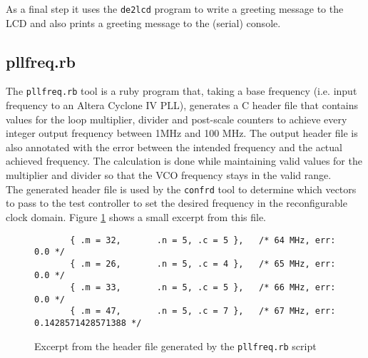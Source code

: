 As a final step it uses the \texttt{de2lcd} program to write a greeting message to the LCD
and also prints a greeting message to the (serial) console.


\subsection{pllfreq.rb}
The \texttt{pllfreq.rb} tool is a ruby program that, taking a base frequency (i.e. input
frequency to an Altera Cyclone IV PLL), generates a C header file that contains values
for the loop multiplier, divider and post-scale counters to achieve every integer
output frequency between 1MHz and 100 MHz. The output header file is also annotated with the
error between the intended frequency and the actual achieved frequency. The calculation
is done while maintaining valid values for the multiplier and divider so that the VCO
frequency stays in the valid range.
\\

The generated header file is used by the \texttt{confrd} tool to determine which vectors
to pass to the test controller to set the desired frequency in the reconfigurable
clock domain. Figure \ref{listing:pllfreq_h} shows a small excerpt from this file.

\begin{figure}[h!]
\lstset{basicstyle=\scriptsize\ttfamily}
\begin{lstlisting}
       { .m = 32,       .n = 5, .c = 5 },   /* 64 MHz, err: 0.0 */
       { .m = 26,       .n = 5, .c = 4 },   /* 65 MHz, err: 0.0 */
       { .m = 33,       .n = 5, .c = 5 },   /* 66 MHz, err: 0.0 */
       { .m = 47,       .n = 5, .c = 7 },   /* 67 MHz, err: 0.1428571428571388 */
\end{lstlisting}
\caption{Excerpt from the header file generated by the \texttt{pllfreq.rb} script}
\label{listing:pllfreq_h}
\end{figure}